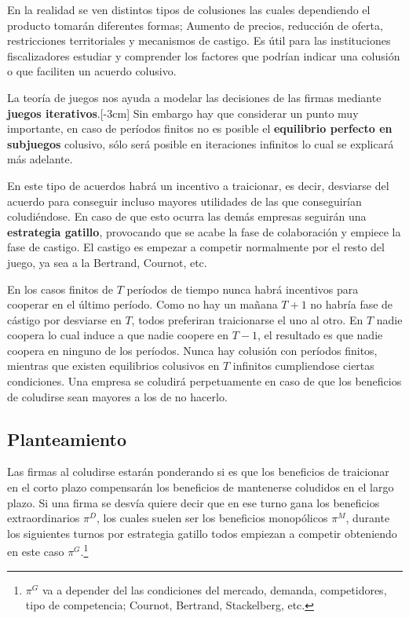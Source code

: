En la realidad se ven distintos tipos de colusiones las cuales dependiendo el producto tomarán diferentes formas; Aumento de precios, reducción de oferta, restricciones territoriales y mecanismos de castigo. Es útil para las instituciones fiscalizadores estudiar y comprender los factores que podrían indicar una colusión o que faciliten un acuerdo colusivo. 

La teoría de juegos nos ayuda a modelar las decisiones de las firmas mediante \textbf{juegos iterativos}.[-3cm] Sin embargo hay que considerar un punto muy importante, en caso de períodos finitos no es posible el \textbf{equilibrio perfecto en subjuegos} colusivo, sólo será posible en iteraciones infinitos lo cual se explicará más adelante.

En este tipo de acuerdos habrá un incentivo a traicionar, es decir, desviarse del acuerdo para conseguir incluso mayores utilidades de las que conseguirían coludiéndose. En caso de que esto ocurra las demás empresas seguirán una \textbf{estrategia gatillo}, provocando que se acabe la fase de colaboración y empiece la fase de castigo. El castigo es empezar a competir normalmente por el resto del juego, ya sea a la Bertrand, Cournot, etc.

En los casos finitos de $T$ períodos de tiempo nunca habrá incentivos para cooperar en el último período. Como no hay un mañana $T+1$ no habría fase de cástigo por desviarse en $T$, todos preferiran traicionarse el uno al otro. En $T$ nadie coopera lo cual induce a que nadie coopere en $T-1$, el resultado es que nadie coopera en ninguno de los períodos. Nunca hay colusión con períodos finitos, mientras que existen equilibrios colusivos en $T$ infinitos cumpliendose ciertas condiciones. Una empresa se coludirá perpetuamente en caso de que los beneficios de coludirse sean mayores a los de no hacerlo. 

\subsection*{Planteamiento}

Las firmas al coludirse estarán ponderando si es que los beneficios de traicionar en el corto plazo compensarán los beneficios de mantenerse coludidos en el largo plazo. Si una firma se desvía quiere decir que en ese turno gana los beneficios extraordinarios $\pi^D$, los cuales suelen ser los beneficios monopólicos $\pi^M$, durante los siguientes turnos por estrategia gatillo todos empiezan a competir obteniendo en este caso $\pi^G$.\footnote{$\pi^G$ va a depender del las condiciones del mercado, demanda, competidores, tipo de competencia; Cournot, Bertrand, Stackelberg, etc.}

